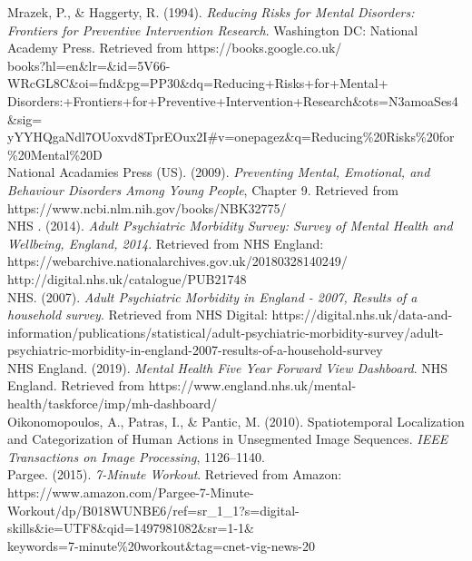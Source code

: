 \documentclass[a4paper,11pt]{report}
\begin{document}
Mrazek, P., \& Haggerty, R. (1994). \textit{Reducing Risks for Mental Disorders: Frontiers for Preventive Intervention Research}. Washington DC: National Academy Press. Retrieved from https://books.google.co.uk/\\books?hl=en\&lr=\&id=5V66-WRcGL8C\&oi=fnd\&pg=PP30\&dq=Reducing+Risks+for+Mental+\\Disorders:+Frontiers+for+Preventive+Intervention+Research\&ots=N3amoaSes4\&sig=\\yYYHQgaNdl7OUoxvd8TprEOux2I\#v=onepagez\&q=Reducing\%20Risks\%20for\%20Mental\%20D\\

National Acadamies Press (US). (2009). \textit{Preventing Mental, Emotional, and Behaviour Disorders Among Young People}, Chapter 9. Retrieved from https://www.ncbi.nlm.nih.gov/books/NBK32775/\\

NHS . (2014). \textit{Adult Psychiatric Morbidity Survey: Survey of Mental Health and Wellbeing, England, 2014}. Retrieved from NHS England: https://webarchive.nationalarchives.gov.uk/20180328140249/\\http://digital.nhs.uk/catalogue/PUB21748\\

NHS. (2007). \textit{Adult Psychiatric Morbidity in England - 2007, Results of a household survey}. Retrieved from NHS Digital: https://digital.nhs.uk/data-and-information/publications/statistical/adult-psychiatric-morbidity-survey/adult-psychiatric-morbidity-in-england-2007-results-of-a-household-survey\\

NHS England. (2019). \textit{Mental Health Five Year Forward View Dashboard}. NHS England. Retrieved from https://www.england.nhs.uk/mental-health/taskforce/imp/mh-dashboard/\\

Oikonomopoulos, A., Patras, I., \& Pantic, M. (2010). Spatiotemporal Localization and Categorization of Human Actions in Unsegmented Image Sequences. \textit{IEEE Transactions on Image Processing}, 1126–1140.\\

Pargee. (2015). \textit{7-Minute Workout}. Retrieved from Amazon: https://www.amazon.com/Pargee-7-Minute-Workout/dp/B018WUNBE6/ref=sr\_1\_1?s=digital-skills\&ie=UTF8\&qid=1497981082\&sr=1-1\&\\keywords=7-minute\%20workout\&tag=cnet-vig-news-20\\
\end{document}
